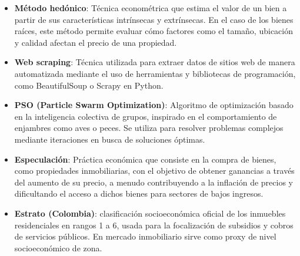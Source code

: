 

\begin{itemize}
    \item \textbf{Método hedónico}: Técnica econométrica que estima el valor de un bien a partir de sus características intrínsecas y extrínsecas. En el caso de los bienes raíces, este método permite evaluar cómo factores como el tamaño, ubicación y calidad afectan el precio de una propiedad.

    \item \textbf{Web scraping}: Técnica utilizada para extraer datos de sitios web de manera automatizada mediante el uso de herramientas y bibliotecas de programación, como BeautifulSoup o Scrapy en Python.

    \item \textbf{PSO (Particle Swarm Optimization)}: Algoritmo de optimización basado en la inteligencia colectiva de grupos, inspirado en el comportamiento de enjambres como aves o peces. Se utiliza para resolver problemas complejos mediante iteraciones en busca de soluciones óptimas.

    \item \textbf{Especulación}: Práctica económica que consiste en la compra de bienes, como propiedades inmobiliarias, con el objetivo de obtener ganancias a través del aumento de su precio, a menudo contribuyendo a la inflación de precios y dificultando el acceso a dichos bienes para sectores de bajos ingresos.
    
    \item \textbf{Estrato (Colombia)}: clasificación socioeconómica oficial de los inmuebles residenciales en rangos 1 a 6, usada para la focalización de subsidios y cobros de servicios públicos. En mercado inmobiliario sirve como proxy de nivel socioeconómico de zona. \cite{dane_estratificacion}


\end{itemize}
